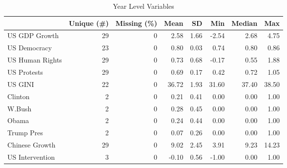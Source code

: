 \begin{table}

\caption{Year Level Variables}
\centering
\begin{tabular}[t]{lrrrrrrr}
\toprule
  & Unique (\#) & Missing (\%) & Mean & SD & Min & Median & Max\\
\midrule
US GDP Growth & 29 & 0 & 2.58 & 1.66 & -2.54 & 2.68 & 4.75\\
US Democracy & 23 & 0 & 0.80 & 0.03 & 0.74 & 0.80 & 0.86\\
US Human Rights & 29 & 0 & 0.73 & 0.68 & -0.17 & 0.55 & 1.88\\
US Protests & 29 & 0 & 0.69 & 0.17 & 0.42 & 0.72 & 1.05\\
US GINI & 22 & 0 & 36.72 & 1.93 & 31.60 & 37.40 & 38.50\\
Clinton & 2 & 0 & 0.21 & 0.41 & 0.00 & 0.00 & 1.00\\
W.Bush & 2 & 0 & 0.28 & 0.45 & 0.00 & 0.00 & 1.00\\
Obama & 2 & 0 & 0.24 & 0.44 & 0.00 & 0.00 & 1.00\\
Trump Pres & 2 & 0 & 0.07 & 0.26 & 0.00 & 0.00 & 1.00\\
Chinese Growth & 29 & 0 & 9.02 & 2.45 & 3.91 & 9.23 & 14.23\\
US Intervention & 3 & 0 & -0.10 & 0.56 & -1.00 & 0.00 & 1.00\\
\bottomrule
\end{tabular}
\end{table}
